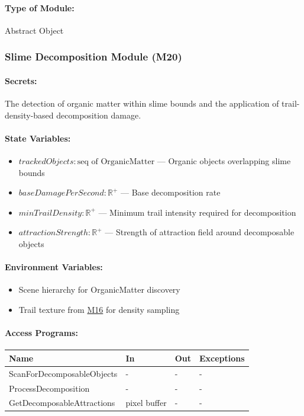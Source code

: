 \documentclass[12pt, titlepage]{article}
\begin{document}
\paragraph{Type of Module:}
Abstract Object

\vspace{10mm}

\subsubsection{Slime Decomposition Module (M20)} \label{M20}

\paragraph{Secrets:}
The detection of organic matter within slime bounds and the application of trail-density-based
decomposition damage.

\paragraph{State Variables:}
\begin{itemize}
\item $trackedObjects : \text{seq of OrganicMatter}$ --- Organic objects overlapping slime bounds
\item $baseDamagePerSecond : \mathbb{R}^+$ --- Base decomposition rate
\item $minTrailDensity : \mathbb{R}^+$ --- Minimum trail intensity required for decomposition
\item $attractionStrength : \mathbb{R}^+$ --- Strength of attraction field around decomposable objects
\end{itemize}

\paragraph{Environment Variables:}
\begin{itemize}
\item Scene hierarchy for OrganicMatter discovery
\item Trail texture from \hyperref[M16]{M16} for density sampling
\end{itemize}

\paragraph{Access Programs:}

\begin{center}
\begin{tabular}{p{50mm}p{2.5cm}p{2.5cm}p{22mm}}
\toprule
\textbf{Name} & \textbf{In} & \textbf{Out} & \textbf{Exceptions} \\
\midrule
ScanForDecomposableObjects & - & - & - \\
ProcessDecomposition & - & - & - \\
GetDecomposableAttractions & pixel buffer & - & - \\
\bottomrule
\end{tabular}
\end{center}
\end{document}
